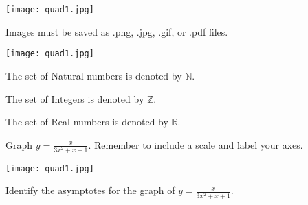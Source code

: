 \documentclass[11pt]{article}
\def\eq1{y=\frac{x}{3x^2+x+1}}
\def\labelaxes{Remember to include a scale and label your axes.}
\begin{document}
\begin{center}
\texttt{[image: quad1.jpg]}

Images must be saved as .png, .jpg, .gif, or .pdf files.
\end{center}

\begin{center}
\texttt{[image: quad1.jpg]}
\end{center}

The set of Natural numbers is denoted by $\mathbb{N}$.

The set of Integers is denoted by $\mathbb{Z}$.

The set of Real numbers is denoted by $\mathbb{R}$.

Graph $\eq1$. \labelaxes

\texttt{[image: quad1.jpg]}

Identify the asymptotes for the graph of $\eq1$.
\end{document}
